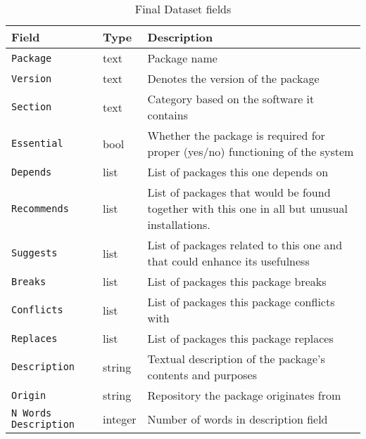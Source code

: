 



\begingroup
    \renewcommand{\arraystretch}{2} %
    \begin{table}[!htb]
        \centering
        \begin{tabular}{@{}p{20mm} | l p{37mm}}
            \textbf{Field}     &          \textbf{Type}   & \textbf{Description}    \\  \hline 
            \texttt{Package}                  & text    & Package name        \\ 
            \texttt{Version}                   & text        & Denotes the version of the package \\ 
            \texttt{Section}                   & text     & Category based on the software it contains \\ 
            \texttt{Essential}            & bool  & Whether the package is required for proper (yes/no) functioning of the system   \\ 
            \texttt{Depends}               & list       & List of packages this one depends on      \\ 
            \texttt{Recommends}             & list       & List of packages that would be found together with this one in all but unusual installations.        \\ 
            \texttt{Suggests}             & list       & List of packages related to this one and that could enhance its usefulness          \\ 
            \texttt{Breaks}          & list          & List of packages this package breaks         \\ 
            \texttt{Conflicts}              & list       & List of packages this package conflicts with  \\
            \texttt{Replaces}        & list            & List of packages this package replaces          \\
            \texttt{Description}       & string    & Textual description of the package's contents and purposes \\ 
            \texttt{Origin}   & string            & Repository the package originates from     \\ 
            \texttt{N Words Description}  & integer   & Number of words in description field      \\ 
        \end{tabular}
        \caption{Final Dataset fields} \label{tab:fields}
    \end{table}
\endgroup